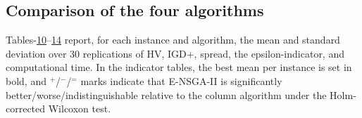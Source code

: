 \documentclass[11pt, a4paper]{article}
\begin{document}
\hypertarget{comparison-of-the-four-algorithms}{%
\subsection{Comparison of the four
algorithms}\label{comparison-of-the-four-algorithms}}

Tables-\protect\hyperlink{tab:HV}{10}--\protect\hyperlink{tab:CPU}{14} report, for each instance and algorithm, the mean and standard deviation over 30 replications of HV, IGD+, spread, the epsilon-indicator, and computational time. In the indicator tables, the best mean per instance is set in bold, and $^{+}$/$^{-}$/$^{=}$ marks indicate that E-NSGA-II is significantly better/worse/indistinguishable relative to the column algorithm under the Holm-corrected Wilcoxon test.

\hypertarget{tab:HV}{}
\end{document}
